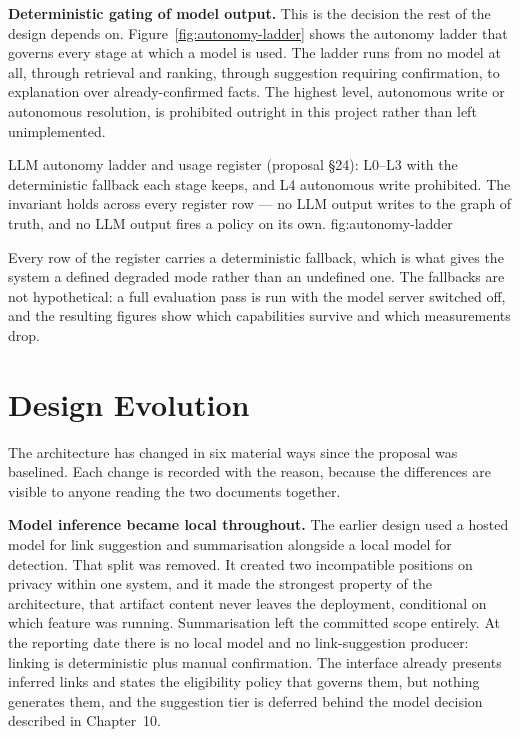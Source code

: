 \textbf{Deterministic gating of model output.} This is the decision the rest of
the design depends on. Figure~\ref{fig:autonomy-ladder} shows the autonomy
ladder that governs every stage at which a model is used. The ladder runs from
no model at all, through retrieval and ranking, through suggestion requiring
confirmation, to explanation over already-confirmed facts. The highest level,
autonomous write or autonomous resolution, is prohibited outright in this
project rather than left unimplemented.

\lsfigure{}
  {LLM autonomy ladder and usage register (proposal §24): L0–L3 with
           the deterministic fallback each stage keeps, and L4 autonomous
           write prohibited. The invariant holds across every register row —
           no LLM output writes to the graph of truth, and no LLM output
           fires a policy on its own.}
  {fig:autonomy-ladder}

Every row of the register carries a deterministic fallback, which is what gives
the system a defined degraded mode rather than an undefined one. The fallbacks
are not hypothetical: a full evaluation pass is run with the model server
switched off, and the resulting figures show which capabilities survive and
which measurements drop.

\section{Design Evolution}

The architecture has changed in six material ways since the proposal was
baselined. Each change is recorded with the reason, because the differences are
visible to anyone reading the two documents together.

\textbf{Model inference became local throughout.} The earlier design used a
hosted model for link suggestion and summarisation alongside a local model for
detection. That split was removed. It created two incompatible positions on
privacy within one system, and it made the strongest property of the
architecture, that artifact content never leaves the deployment, conditional on
which feature was running. Summarisation left the committed scope entirely. At the reporting date there is
no local model and no link-suggestion producer: linking is deterministic plus
manual confirmation. The interface already presents inferred links and states
the eligibility policy that governs them, but nothing generates them, and the
suggestion tier is deferred behind the model decision described in Chapter~10.

